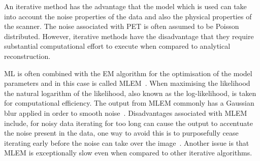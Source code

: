 
            An iterative method has the advantage that the model which is used can take into account the noise properties of the data and also the physical properties of the scanner. The noise associated with \gls{PET} is often assumed to be Poisson distributed. However, iterative methods have the disadvantage that they require substantial computational effort to execute when compared to analytical reconstruction.
            
            \gls{ML} is often combined with the \gls{EM} algorithm for the optimisation of the model parameters and in this case is called \gls{MLEM}~\parencite{MLEMBib, PETMLEMBib, PETMLEM2Bib}. When maximising the likelihood the natural logarithm of the likelihood, also known as the log-likelihood, is taken for computational efficiency. The output from \gls{MLEM} commonly has a Gaussian blur applied in order to smooth noise~\parencite{PETMLEMFiltBib}. Disadvantages associated with \gls{MLEM} include, for noisy data iterating for too long can cause the output to accentuate the noise present in the data, one way to avoid this is to purposefully cease iterating early before the noise can take over the image~\parencite{PETMLEMTerminationBib}. Another issue is that \gls{MLEM} is exceptionally slow even when compared to other iterative algorithms. %
            
